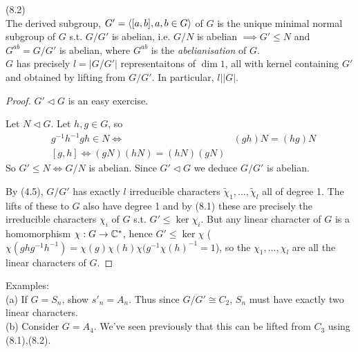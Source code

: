 \documentclass[a4paper]{article}
\begin{document}
\begin{lemma} (8.2)\\
The derived subgroup, $G' = \langle[a,b],a,b \in G \rangle$ of $G$ is the unique minimal normal subgroup of $G$ s.t. $G/G'$ is abelian, i.e. $G/N$ is abelian $\implies G' \leq N$ and $G^{ab}=G/G'$ is abelian, where $G^{ab}$ is the \emph{abelianisation} of $G$.\\
$G$ has precisely $l=|G/G'|$ representaitons of $\dim 1$, all with kernel containing $G'$ and obtained by lifting from $G/G'$. In particular, $l | |G|$.
\begin{proof}
$G'\triangleleft G$ is an easy exercise.

Let $N \triangleleft G$. Let $h,g \in G$, so 
\begin{equation*}
\begin{aligned}
&g^{-1}h^{-1}gh \in N \iff &(gh)N = (hg)N\\
&[g,h] \iff (gN)(hN) = (hN)(gN)
\end{aligned}
\end{equation*}
So $G' \leq N \iff G/N$ is abelian. Since $G' \triangleleft G$ we deduce $G/G'$ is abelian.

By (4.5), $G/G'$ has exactly $l$ irreducible characters $\tilde{\chi}_1,...,\tilde{\chi}_l$ all of degree 1. The lifts of these to $G$ also have degree 1 and by (8.1) these are precisely the irreducible characters $\chi_i$ of $G$ s.t. $G' \leq \ker \chi_i$. But any linear character of $G$ is a homomorphism $\chi:G \to \mathbb{C}^*$, hence $G' \leq \ker \chi$ ($\chi(ghg^{-1}h^{-1}) = \chi(g)\chi(h)\chi(g^{-1} \chi(h)^{-1} = 1$), so the $\chi_1,...,\chi_l$ are all the linear characters of $G$.
\end{proof}
\end{lemma}

Examples:\\
(a) If $G=S_n$, show $s'_n = A_n$. Thus since $G/G' \cong C_2$, $S_n$ must have exactly two linear characters.\\
(b) Consider $G=A_4$. We've seen previously that this can be lifted from $C_3$ using (8.1),(8.2).
\end{document}
